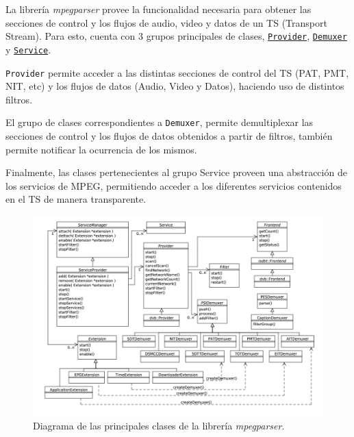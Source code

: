 La librería \emph{mpegparser} provee la funcionalidad necesaria para obtener las secciones de control y los flujos de audio, video y datos
de un TS (Transport Stream). Para esto, cuenta con 3 grupos principales de clases, \hyperlink{classtuner_1_1Provider}{\texttt{Provider}}, \hyperlink{classtuner_1_1demuxer_1_1ts_1_1Demuxer}{\texttt{Demuxer}} y \hyperlink{classtuner_1_1Service}{\texttt{Service}}. 

\texttt{Provider} permite acceder a las distintas secciones de control del TS (PAT, PMT, NIT, etc) y los flujos de datos (Audio, Video y Datos), haciendo uso de distintos filtros.

El grupo de clases correspondientes a \texttt{Demuxer}, permite demultiplexar las secciones de control y los flujos de datos obtenidos a partir de filtros, también permite notificar la ocurrencia de los mismos. 

Finalmente, las clases pertenecientes al grupo Service proveen una abstracción de los servicios de MPEG, permitiendo acceder a los diferentes servicios contenidos en el TS de manera transparente.

\begin{figure}[h!]
	\centering
	\includegraphics[scale=0.5]{resources/uml-dtv-mpegparser.jpg}
	\caption{Diagrama de las principales clases de la librería \emph{mpegparser}.}
\end{figure}

\FloatBarrier
